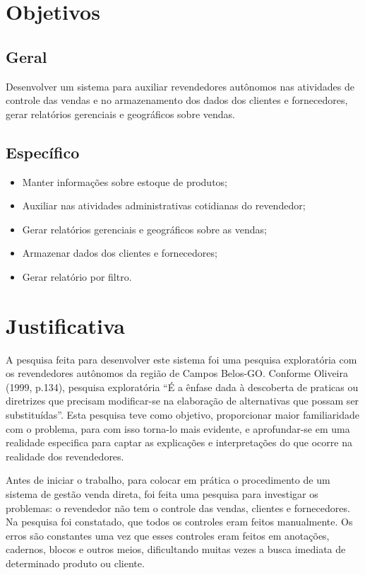 \documentclass[chapter=TITLE,12pt,oneside,a4paper,english,french,sumario=tradicional,spanish,brazil,]{abntex2}
\begin{document}
\chapter{Objetivos}
\section{Geral}
Desenvolver um sistema para auxiliar revendedores autônomos nas atividades de controle das vendas e no armazenamento dos dados dos clientes e fornecedores, gerar relatórios gerenciais e geográficos sobre vendas.

\section{Específico}
\begin{itemize}
  \item	Manter informações sobre estoque de produtos;
  \item	Auxiliar nas atividades administrativas cotidianas do revendedor;
  \item	Gerar relatórios gerenciais e geográficos sobre as vendas;
  \item	Armazenar dados dos clientes e fornecedores;
  \item	Gerar relatório por filtro.
\end{itemize}


\chapter{Justificativa}
A pesquisa feita para desenvolver este sistema foi uma pesquisa exploratória com os revendedores autônomos da região de Campos Belos-GO. Conforme Oliveira (1999, p.134), pesquisa exploratória “É a ênfase dada à descoberta de praticas ou diretrizes que precisam modificar-se na elaboração de alternativas que possam ser substituídas”. Esta pesquisa teve como objetivo, proporcionar maior familiaridade com o problema, para com isso torna-lo mais evidente, e aprofundar-se em uma realidade especifica para captar as explicações e interpretações do que ocorre na realidade dos revendedores.

Antes de iniciar o trabalho, para colocar em prática o procedimento de um sistema de gestão venda direta, foi feita uma pesquisa para investigar os problemas: o revendedor não tem o controle das vendas, clientes e fornecedores. Na pesquisa foi constatado, que todos os controles eram feitos manualmente. Os erros são constantes uma vez que esses controles eram feitos em anotações, cadernos, blocos e outros meios, dificultando muitas vezes a busca imediata de determinado produto ou cliente.
\end{document}
